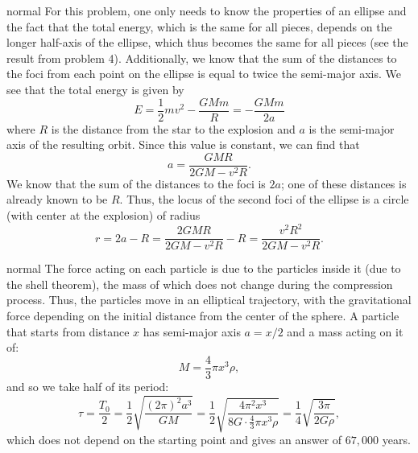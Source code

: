 \documentclass[11pt]{article}
\begin{document}
\newpage
\begin{answer}{normal} %
For this problem, one only needs to know the properties of an ellipse and the fact that the total energy, which is the same for all pieces, depends on the longer half-axis of the ellipse, which thus becomes the same for all pieces (see the result from problem 4). Additionally, we know that the sum of the distances to the foci from each point on the ellipse is equal to twice the semi-major axis. We see that the total energy is given by
$$E=\dfrac{1}{2}mv^2-\dfrac{GMm}{R}=-\dfrac{GMm}{2a}$$
where $R$ is the distance from the star to the explosion and $a$ is the semi-major axis of the resulting orbit. Since this value is constant, we can find that
$$a=\dfrac{GMR}{2GM-v^2R}.$$
We know that the sum of the distances to the foci is $2a$; one of these distances is already known to be $R$. Thus, the locus of the second foci of the ellipse is a circle (with center at the explosion) of radius
$$r=2a-R=\dfrac{2GMR}{2GM-v^2R}-R=\dfrac{v^2R^2}{2GM-v^2R}.$$
\end{answer}

\begin{answer}{normal} %
The force acting on each particle is due to the particles inside it (due to the shell theorem), the mass of which does not change during the compression process. Thus, the particles move in an elliptical trajectory, with the gravitational force depending on the initial distance from the center of the sphere. A particle that starts from distance $x$ has semi-major axis $a=x/2$ and a mass acting on it of:
$$M=\dfrac{4}{3}\pi x^3\rho,$$
and so we take half of its period:
$$\tau=\dfrac{T_0}{2}=\dfrac{1}{2}\sqrt{\dfrac{(2\pi)^2a^3}{GM}}=\dfrac{1}{2}\sqrt{\dfrac{4\pi^2x^3}{8G\cdot\frac{4}{3}\pi x^3\rho}}=\dfrac{1}{4}\sqrt{\dfrac{3\pi}{2G\rho}},$$
which does not depend on the starting point and gives an answer of $67,000$ years.
\end{answer}
\end{document}
